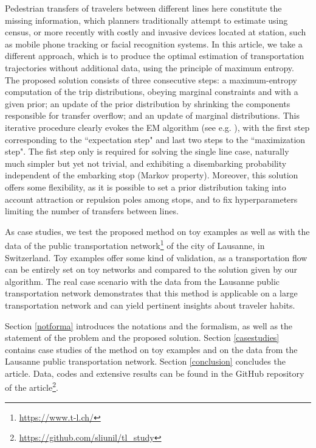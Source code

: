 \documentclass{bmcart}
\begin{document}
Pedestrian transfers of travelers between different lines here constitute the missing information, which planners traditionally attempt to estimate using census, or more recently with costly and invasive devices located at station, such as mobile phone tracking or facial recognition systems. In this article, we take a different approach, which is to produce the optimal estimation of transportation trajectories without additional data, using the principle of maximum entropy. The proposed solution consists of three consecutive steps: a maximum-entropy computation of the trip distributions, obeying marginal constraints and with a given prior;  an update of the prior distribution by shrinking the components responsible for transfer overflow; and an update of marginal distributions. This iterative procedure clearly evokes the EM algorithm (see e.g. \cite{dempster1977maximum}  \cite{bavaud2009information}), with the first step corresponding to the ``expectation step" and last two steps to the ``maximization step". The fist step only is required for solving the single line case, naturally much simpler but  yet  not trivial, and exhibiting a disembarking probability independent of the embarking stop (Markov property). Moreover, this solution offers some flexibility, as it is possible to set a prior distribution taking into account attraction or repulsion poles among stops, and to fix hyperparameters limiting the number of transfers between lines.

As case studies, we test the proposed method on toy examples as well as with the data of the public transportation network\footnote{\url{https://www.t-l.ch/}} of the city of Lausanne, in Switzerland. Toy examples offer some kind of validation, as a transportation flow can be entirely set on toy networks and compared to the solution given by our algorithm. The real case scenario with the data from the Lausanne public transportation network demonstrates that this method is applicable on a large transportation network and can yield pertinent insights about traveler habits.

Section \ref{notforma} introduces the notations and the formalism, as well as the statement of the problem and the proposed solution. Section \ref{casestudies} contains case studies of the method on toy examples and on the data from the Lausanne public transportation network. Section \ref{conclusion} concludes the article. Data, codes and extensive results can be found in the GitHub repository of the article\footnote{\url{https://github.com/sliunil/tl_study}}.
\end{document}
